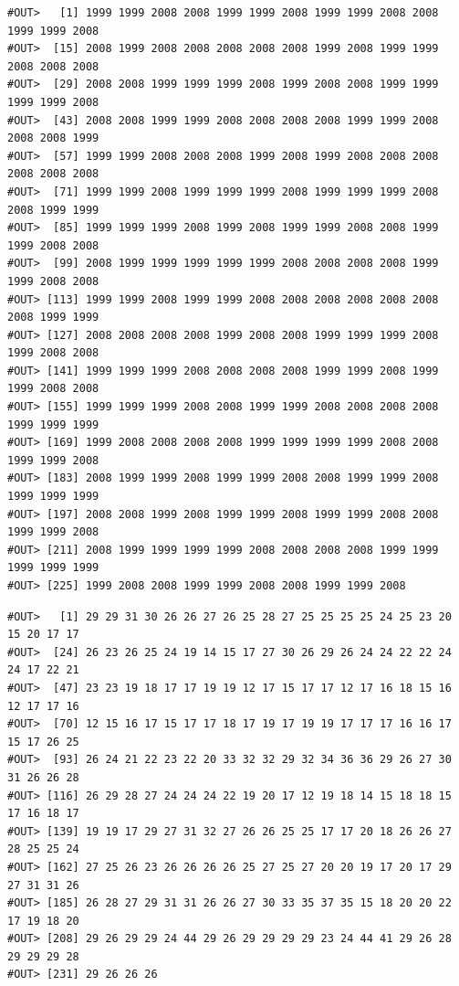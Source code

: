 \documentclass[]{book}
\newenvironment{Shaded}{\begin{snugshade}}{\end{snugshade}}
\newcommand{\NormalTok}[1]{#1}
\newcommand{\OperatorTok}[1]{\textcolor[rgb]{0.81,0.36,0.00}{\textbf{#1}}}
\begin{document}
\begin{verbatim}
#OUT>   [1] 1999 1999 2008 2008 1999 1999 2008 1999 1999 2008 2008 1999 1999 2008
#OUT>  [15] 2008 1999 2008 2008 2008 2008 2008 1999 2008 1999 1999 2008 2008 2008
#OUT>  [29] 2008 2008 1999 1999 1999 2008 1999 2008 2008 1999 1999 1999 1999 2008
#OUT>  [43] 2008 2008 1999 1999 2008 2008 2008 2008 1999 1999 2008 2008 2008 1999
#OUT>  [57] 1999 1999 2008 2008 2008 1999 2008 1999 2008 2008 2008 2008 2008 2008
#OUT>  [71] 1999 1999 2008 1999 1999 1999 2008 1999 1999 1999 2008 2008 1999 1999
#OUT>  [85] 1999 1999 1999 2008 1999 2008 1999 1999 2008 2008 1999 1999 2008 2008
#OUT>  [99] 2008 1999 1999 1999 1999 1999 2008 2008 2008 2008 1999 1999 2008 2008
#OUT> [113] 1999 1999 2008 1999 1999 2008 2008 2008 2008 2008 2008 2008 1999 1999
#OUT> [127] 2008 2008 2008 2008 1999 2008 2008 1999 1999 1999 2008 1999 2008 2008
#OUT> [141] 1999 1999 1999 2008 2008 2008 2008 1999 1999 2008 1999 1999 2008 2008
#OUT> [155] 1999 1999 1999 2008 2008 1999 1999 2008 2008 2008 2008 1999 1999 1999
#OUT> [169] 1999 2008 2008 2008 2008 1999 1999 1999 1999 2008 2008 1999 1999 2008
#OUT> [183] 2008 1999 1999 2008 1999 1999 2008 2008 1999 1999 2008 1999 1999 1999
#OUT> [197] 2008 2008 1999 2008 1999 1999 2008 1999 1999 2008 2008 1999 1999 2008
#OUT> [211] 2008 1999 1999 1999 1999 2008 2008 2008 2008 1999 1999 1999 1999 1999
#OUT> [225] 1999 2008 2008 1999 1999 2008 2008 1999 1999 2008
\end{verbatim}

\begin{Shaded}
\end{Shaded}

\begin{verbatim}
#OUT>   [1] 29 29 31 30 26 26 27 26 25 28 27 25 25 25 25 24 25 23 20 15 20 17 17
#OUT>  [24] 26 23 26 25 24 19 14 15 17 27 30 26 29 26 24 24 22 22 24 24 17 22 21
#OUT>  [47] 23 23 19 18 17 17 19 19 12 17 15 17 17 12 17 16 18 15 16 12 17 17 16
#OUT>  [70] 12 15 16 17 15 17 17 18 17 19 17 19 19 17 17 17 16 16 17 15 17 26 25
#OUT>  [93] 26 24 21 22 23 22 20 33 32 32 29 32 34 36 36 29 26 27 30 31 26 26 28
#OUT> [116] 26 29 28 27 24 24 24 22 19 20 17 12 19 18 14 15 18 18 15 17 16 18 17
#OUT> [139] 19 19 17 29 27 31 32 27 26 26 25 25 17 17 20 18 26 26 27 28 25 25 24
#OUT> [162] 27 25 26 23 26 26 26 26 25 27 25 27 20 20 19 17 20 17 29 27 31 31 26
#OUT> [185] 26 28 27 29 31 31 26 26 27 30 33 35 37 35 15 18 20 20 22 17 19 18 20
#OUT> [208] 29 26 29 29 24 44 29 26 29 29 29 29 23 24 44 41 29 26 28 29 29 29 28
#OUT> [231] 29 26 26 26
\end{verbatim}
\end{document}
